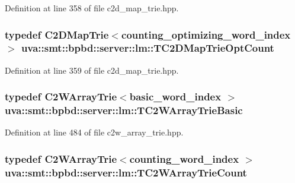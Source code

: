 Definition at line 358 of file c2d\+\_\+map\+\_\+trie.\+hpp.

\hypertarget{namespaceuva_1_1smt_1_1bpbd_1_1server_1_1lm_ad514648b30bf36a97eb149f369a28c0c}{}
\subsubsection[{T\+C2\+D\+Map\+Trie\+Opt\+Count}]{\setlength{\rightskip}{0pt plus 5cm}typedef {\bf C2\+D\+Map\+Trie}$<${\bf counting\+\_\+optimizing\+\_\+word\+\_\+index} $>$ {\bf uva\+::smt\+::bpbd\+::server\+::lm\+::\+T\+C2\+D\+Map\+Trie\+Opt\+Count}}\label{namespaceuva_1_1smt_1_1bpbd_1_1server_1_1lm_ad514648b30bf36a97eb149f369a28c0c}


Definition at line 359 of file c2d\+\_\+map\+\_\+trie.\+hpp.

\hypertarget{namespaceuva_1_1smt_1_1bpbd_1_1server_1_1lm_a454a32eb35e3a62f7c0e1f223955e241}{}
\subsubsection[{T\+C2\+W\+Array\+Trie\+Basic}]{\setlength{\rightskip}{0pt plus 5cm}typedef {\bf C2\+W\+Array\+Trie}$<${\bf basic\+\_\+word\+\_\+index} $>$ {\bf uva\+::smt\+::bpbd\+::server\+::lm\+::\+T\+C2\+W\+Array\+Trie\+Basic}}\label{namespaceuva_1_1smt_1_1bpbd_1_1server_1_1lm_a454a32eb35e3a62f7c0e1f223955e241}


Definition at line 484 of file c2w\+\_\+array\+\_\+trie.\+hpp.

\hypertarget{namespaceuva_1_1smt_1_1bpbd_1_1server_1_1lm_a6332586fdb6537c927babe65eea4c5dc}{}
\subsubsection[{T\+C2\+W\+Array\+Trie\+Count}]{\setlength{\rightskip}{0pt plus 5cm}typedef {\bf C2\+W\+Array\+Trie}$<${\bf counting\+\_\+word\+\_\+index} $>$ {\bf uva\+::smt\+::bpbd\+::server\+::lm\+::\+T\+C2\+W\+Array\+Trie\+Count}}\label{namespaceuva_1_1smt_1_1bpbd_1_1server_1_1lm_a6332586fdb6537c927babe65eea4c5dc}


